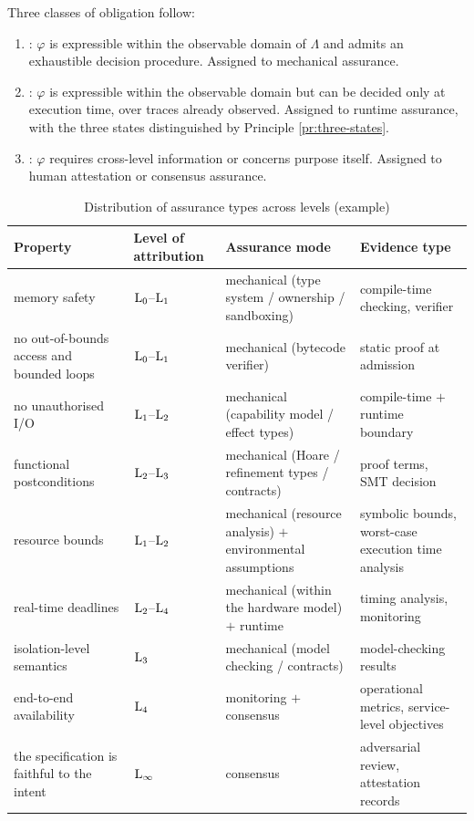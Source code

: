 Three classes of obligation follow:

\begin{enumerate}[label=(\alph*)]
\item {}: $\varphi$ is expressible within the
      observable domain of $\Lambda$ and admits an exhaustible decision procedure. Assigned
      to mechanical assurance.
\item {}: $\varphi$ is expressible within the
      observable domain but can be decided only at execution time, over traces already
      observed. Assigned to runtime assurance, with the three states distinguished by
      Principle \ref{pr:three-states}.
\item {}: $\varphi$ requires cross-level information or
      concerns purpose itself. Assigned to human attestation or consensus assurance.
\end{enumerate}

\begin{table}[htbp]
\centering
\footnotesize
\caption{Distribution of assurance types across levels (example)}\label{tab:assurance-matrix}
\begin{tabular}{L{4.2cm}L{3.2cm}L{3.2cm}L{3.6cm}}
\toprule
\textbf{Property} & \textbf{Level of attribution} & \textbf{Assurance mode} &
  \textbf{Evidence type} \\
\midrule
memory safety & $\mathrm{L}_{0}$--$\mathrm{L}_{1}$ & mechanical (type system / ownership / sandboxing) &
  compile-time checking, verifier \\
no out-of-bounds access and bounded loops & $\mathrm{L}_{0}$--$\mathrm{L}_{1}$ &
  mechanical (bytecode verifier) & static proof at admission \\
no unauthorised I/O & $\mathrm{L}_{1}$--$\mathrm{L}_{2}$ & mechanical (capability model / effect types) &
  compile-time $+$ runtime boundary \\
functional postconditions & $\mathrm{L}_{2}$--$\mathrm{L}_{3}$ &
  mechanical (Hoare / refinement types / contracts) & proof terms, SMT decision \\
resource bounds & $\mathrm{L}_{1}$--$\mathrm{L}_{2}$ & mechanical (resource analysis) $+$
  environmental assumptions & symbolic bounds, worst-case execution time analysis \\
real-time deadlines & $\mathrm{L}_{2}$--$\mathrm{L}_{4}$ & mechanical (within the hardware model) $+$
  runtime & timing analysis, monitoring \\
isolation-level semantics & $\mathrm{L}_{3}$ & mechanical (model checking / contracts) &
  model-checking results \\
end-to-end availability & $\mathrm{L}_{4}$ & monitoring $+$ consensus &
  operational metrics, service-level objectives \\
the specification is faithful to the intent & $\mathrm{L}_{\infty}$ & consensus &
  adversarial review, attestation records \\
\bottomrule
\end{tabular}
\end{table}

